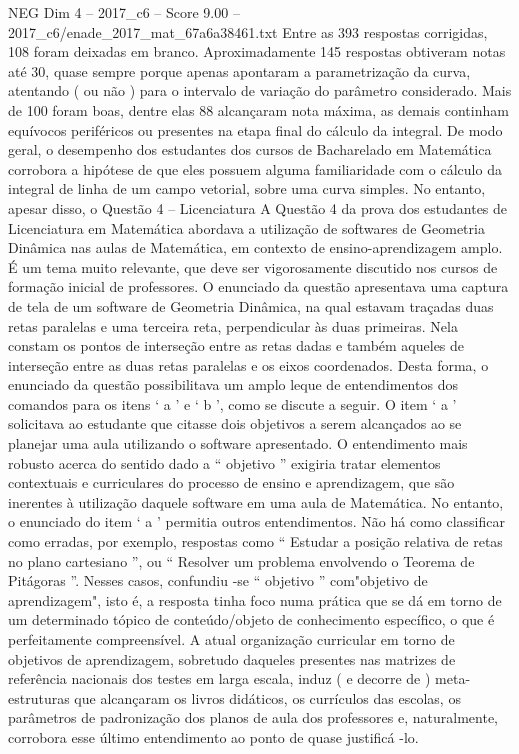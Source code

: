 \begin{textsample}{NEG Dim 4 – 2017\_c6 – Score 9.00 – 2017\_c6/enade\_2017\_mat\_67a6a38461.txt}
Entre as 393 respostas corrigidas, 108 foram deixadas em branco.
Aproximadamente 145 respostas obtiveram notas até 30, quase sempre porque apenas apontaram a parametrização da curva, atentando ( ou não ) para o intervalo de variação do parâmetro considerado.
Mais de 100 foram boas, dentre elas 88 alcançaram nota máxima, as demais continham equívocos periféricos ou presentes na etapa final do cálculo da integral.
De modo geral, o desempenho dos estudantes dos cursos de Bacharelado em Matemática corrobora a hipótese de que eles possuem alguma familiaridade com o cálculo da integral de linha de um campo vetorial, sobre uma curva simples.
No entanto, apesar disso, o Questão 4 – Licenciatura A Questão 4 da prova dos estudantes de Licenciatura em Matemática abordava a utilização de softwares de Geometria Dinâmica nas aulas de Matemática, em contexto de ensino-aprendizagem amplo.
É um tema muito relevante, que deve ser vigorosamente discutido nos cursos de formação inicial de professores.
O enunciado da questão apresentava uma captura de tela de um software de Geometria Dinâmica, na qual estavam traçadas duas retas paralelas e uma terceira reta, perpendicular às duas primeiras.
Nela constam os pontos de interseção entre as retas dadas e também aqueles de interseção entre as duas retas paralelas e os eixos coordenados.
Desta forma, o enunciado da questão possibilitava um amplo leque de entendimentos dos comandos para os itens ‘ a ’ e ‘ b ’, como se discute a seguir.
O item ‘ a ’ solicitava ao estudante que citasse dois objetivos a serem alcançados ao se planejar uma aula utilizando o software apresentado.
O entendimento mais robusto acerca do sentido dado a “ objetivo ” exigiria tratar elementos contextuais e curriculares do processo de ensino e aprendizagem, que são inerentes à utilização daquele software em uma aula de Matemática.
No entanto, o enunciado do item ‘ a ’ permitia outros entendimentos.
Não há como classificar como erradas, por exemplo, respostas como “ Estudar a posição relativa de retas no plano cartesiano ”, ou “ Resolver um problema envolvendo o Teorema de Pitágoras ”.
Nesses casos, confundiu -se “ objetivo ” com"objetivo de aprendizagem", isto é, a resposta tinha foco numa prática que se dá em torno de um determinado tópico de conteúdo/objeto de conhecimento específico, o que é perfeitamente compreensível.
A atual organização curricular em torno de objetivos de aprendizagem, sobretudo daqueles presentes nas matrizes de referência nacionais dos testes em larga escala, induz ( e decorre de ) meta-estruturas que alcançaram os livros didáticos, os currículos das escolas, os parâmetros de padronização dos planos de aula dos professores e, naturalmente, corrobora esse último entendimento ao ponto de quase justificá -lo.

\end{textsample}
